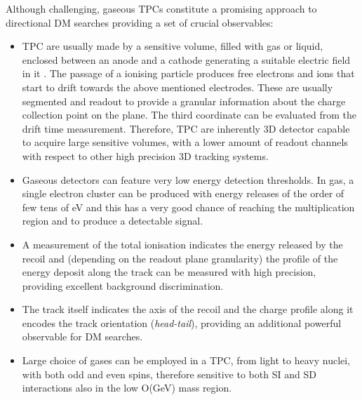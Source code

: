 \documentclass[physics,article,submit,moreauthors,pdftex]{Definitions/mdpi}
\begin{document}
Although challenging, gaseous TPCs constitute a promising approach to directional DM searches providing a set of crucial  observables:
\begin{itemize}

\item TPC are usually made by a sensitive volume, filled with gas or liquid, enclosed between an anode and a cathode generating a suitable electric field in it \cite{bib:tpc1, bib:tpc2, bib:tpc3}. The passage of a ionising particle produces free electrons and ions that start to drift towards the above mentioned electrodes. These are usually segmented and readout to provide a granular information about the charge collection point on the plane. The third coordinate can be evaluated from the drift time measurement.
Therefore, TPC are inherently 3D detector capable to acquire large sensitive volumes, with a lower amount of readout channels with respect to other high precision 3D tracking systems.

\item Gaseous detectors can feature very low energy detection thresholds. In gas, a single electron cluster can be produced with energy releases of the order of few tens of eV and this has a very good chance of reaching the multiplication region and to produce a detectable signal.

\item A measurement of the  total ionisation indicates the energy released by the recoil and (depending on the readout plane granularity) the profile of the energy deposit along the track can be measured with high precision, providing excellent background discrimination.

\item The track itself indicates the axis of the recoil and the charge profile along it encodes the track orientation ({\it head-tail}), providing an additional powerful observable for DM searches. 

\item  Large choice of gases can be employed in a TPC, from light to heavy nuclei, with both odd and even spins, therefore sensitive to both SI and SD interactions also in the low O(GeV) mass region.


\end{itemize}
\end{document}
